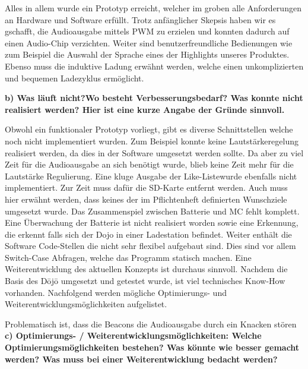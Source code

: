 Alles in allem wurde ein Prototyp erreicht, welcher im groben alle Anforderungen an Hardware und Software erfüllt. Trotz anfänglicher Skepsis haben wir es gschafft, die Audioausgabe mittels PWM zu erzielen und konnten dadurch auf einen Audio-Chip verzichten. Weiter sind benutzerfreundliche Bedienungen wie zum Beispiel die Auswahl der Sprache eines der Highlights unseres Produktes. Ebenso muss die induktive Ladung erwähnt werden, welche einen unkomplizierten und bequemen Ladezyklus ermöglicht.

\textbf{b) Was läuft nicht?Wo besteht Verbesserungsbedarf? Was konnte nicht realisiert werden? Hier ist eine kurze Angabe der Gründe sinnvoll.}

Obwohl ein funktionaler Prototyp vorliegt, gibt es diverse Schnittstellen welche noch nicht implementiert wurden. Zum Beispiel konnte keine Lautstärkeregelung realisiert werden, da dies in der Software umgesetzt werden sollte. Da aber zu viel Zeit für die Audioausgabe an sich benötigt wurde, blieb keine Zeit mehr für die Lautstärke Regulierung. Eine kluge Ausgabe der \glqq Like-Liste\grqq wurde ebenfalls nicht implementiert. Zur Zeit muss dafür die SD-Karte entfernt werden. Auch muss hier erwähnt werden, dass keines der im Pflichtenheft definierten Wunschziele umgesetzt wurde.
Das Zusammenspiel zwischen Batterie und MC fehlt komplett. Eine Überwachung der Batterie ist nicht realisiert worden sowie eine Erkennung, die erkennt falls sich der Dojo in einer Ladestation befindet. Weiter enthält die Software Code-Stellen die nicht sehr flexibel aufgebaut sind. Dies sind vor allem Switch-Case Abfragen, welche das Programm statisch machen.
Eine Weiterentwicklung des aktuellen Konzepts ist durchaus sinnvoll. Nachdem die Basis des Dōjō umgesetzt und getestet wurde, ist viel technisches \glqq Know-How \grqq vorhanden. Nachfolgend werden mögliche Optimierungs- und Weiterentwicklungsmöglichkeiten aufgelistet. 

 Problematisch ist, dass die Beacons die Audioausgabe durch ein Knacken stören\\
 
\textbf{c) Optimierungs- / Weiterentwicklungsmöglichkeiten: Welche Optimierungsmöglichkeiten bestehen? Was könnte wie besser gemacht werden? Was muss bei einer Weiterentwicklung bedacht werden?}

